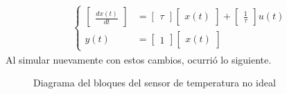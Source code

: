 \documentclass[a4paper, 10pt, onecolumn,journal]{ieeeconf}
\begin{document}
\begin{align}
	\begin{cases}
		\begin{bmatrix}
			\frac{d x(t)}{dt} 
		\end{bmatrix} &= 
		\begin{bmatrix}
			\tau
		\end{bmatrix}
		\begin{bmatrix}
			x(t) 
		\end{bmatrix} + 
		\begin{bmatrix}
			\frac{1}{\tau}
		\end{bmatrix} u(t) \\
		y(t) &= \begin{bmatrix}
			1 
		\end{bmatrix} 
		\begin{bmatrix}
			x(t)
		\end{bmatrix}
	\end{cases}\label{ecuacion matricial de sensor de temperatura}
\end{align}
Al simular nuevamente con estos cambios, ocurrió lo siguiente.
\begin{figure}[H]
	\centering
	\begin{adjustbox}{max width=\columnwidth}
	\end{adjustbox}
	\caption{Diagrama del bloques del sensor de temperatura no ideal}
	\label{Diagrama del bloques del sensor de temperatura no ideal}
\end{figure}
\end{document}
